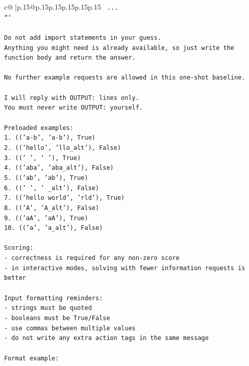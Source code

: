\documentclass{article}
\begin{document}
{\begin{supertabular}{c@{$\;$}|p{.15\linewidth}@{}p{.15\linewidth}p{.15\linewidth}p{.15\linewidth}p{.15\linewidth}p{.15\linewidth}}
{{{\texttt{    ...} \\
\texttt{```} \\
\\ 
\texttt{Do not add import statements in your guess.} \\
\texttt{Anything you might need is already available, so just write the function body and return the answer.} \\
\\ 
\texttt{No further example requests are allowed in this one{-}shot baseline.} \\
\\ 
\texttt{I will reply with OUTPUT: lines only.} \\
\texttt{You must never write OUTPUT: yourself.} \\
\\ 
\texttt{Preloaded examples:} \\
\texttt{1. (('a{-}b', 'a{-}b'), True)} \\
\texttt{2. (('hello', 'llo\_alt'), False)} \\
\texttt{3. (('   ', '   '), True)} \\
\texttt{4. (('aba', 'aba\_alt'), False)} \\
\texttt{5. (('ab', 'ab'), True)} \\
\texttt{6. ((' ', ' \_alt'), False)} \\
\texttt{7. (('hello world', 'rld'), True)} \\
\texttt{8. (('A', 'A\_alt'), False)} \\
\texttt{9. (('aA', 'aA'), True)} \\
\texttt{10. (('a', 'a\_alt'), False)} \\
\\ 
\texttt{Scoring:} \\
\texttt{{-} correctness is required for any non{-}zero score} \\
\texttt{{-} in interactive modes, solving with fewer information requests is better} \\
\\ 
\texttt{Input formatting reminders:} \\
\texttt{{-} strings must be quoted} \\
\texttt{{-} booleans must be True/False} \\
\texttt{{-} use commas between multiple values} \\
\texttt{{-} do not write any extra action tags in the same message} \\
\\ 
\texttt{Format example:} \\
}}}
\end{supertabular}}
\end{document}
